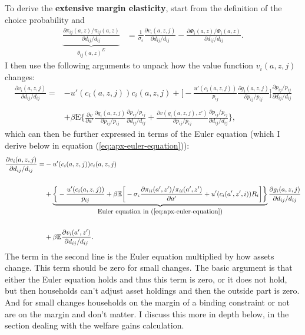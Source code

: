 \documentclass[12pt,pdftex]{article}
\begin{document}
\begin{onehalfspacing}
To derive the \textbf{extensive margin elasticity}, start from the definition of the choice probability and
\begin{align}
\underbrace{ \frac{\partial \pi_{ij}(a,z) / \pi_{ij}(a,z)}{\partial d_{ij} / d_{ij}} }_{\theta_{ij}(a,z)^{E}} &= \frac{1}{\sigma_{\epsilon}}\frac{\partial v_{i}(a, z, j)}{\partial d_{ij}/d_{ij}} -  \frac{\partial \Phi_{i}(a,z) / \Phi_{i}(a,z)}{\partial d_{ij}/d_{ij}}.
\label{eq:apx-extensive-margin}
\end{align}
I then use the following arguments to unpack how the value function $v_{i}(a, z, j)$ changes:
{\small
\begin{align}
\frac{\partial v_{i}(a,z,j)}{\partial d_{ij}/d_{ij}}  =& -u'(c_{i}(a,z,j))c_{i}(a,z,j) + \bigg [ -\frac{u'(c_{i}(a,z,j))}{p_{ij}}\frac{\partial g_{i}(a,z,j)}{\partial p_{ij}/ p_{ij}} \bigg ]\frac{\partial p_{ij}/p_{ij}}{\partial d_{ij}/ d_{ij}}  \\
\nonumber \\
&+ \beta \mathrm{E} \bigg \{\frac{\partial v}{\partial a'}\frac{\partial g_{i}(a,z,j)}{\partial p_{ij}/ p_{ij}}\frac{ \partial p_{ij}/ p_{ij}}{\partial d_{ij}/ d_{ij}} +  \frac{\partial v(g_{i}(a,z,j),z')}{\partial p_{ij}/ p_{ij}}\frac{ \partial p_{ij}/ p_{ij}}{\partial d_{ij}/ d_{ij}} \bigg \},
\end{align}}
which can then be further expressed in terms of the Euler equation (which I derive below in equation (\ref{eq:apx-euler-equation})):
{\small
\begin{align}
\frac{\partial v_{i}(a,z,j)}{\partial d_{ij}/d_{ij}}  =& -u'(c_{i}(a,z,j))c_{i}(a,z,j) \label{eq:apx-first-term}\\
\nonumber \\
&+ \underbrace{\bigg \{ -\frac{u'(c_{i}(a,z,j))}{p_{ij}} + \beta \mathbb{E} \bigg [ -\sigma_{\epsilon} \frac{\partial \pi_{ii}(a',z') / \pi_{ii}(a',z')}{\partial a'} + u'(c_{i}(a',z',i))R_{i} \bigg ] \bigg \} }_{\mbox{Euler equation in (\ref{eq:apx-euler-equation})}} \frac{\partial g_{i}(a,z,j)}{\partial d_{ij}/ d_{ij}}\\
\nonumber \\
&+  \beta \mathbb{E}\frac{\partial v_{i}(a',z')}{\partial d_{ij}/ d_{ij}}.
\end{align}}
The term in the second line is the Euler equation multiplied by how assets change. This term should be zero for small changes. The basic argument is that either the Euler equation holds and thus this term is zero, or it does not hold, but then households can't adjust asset holdings and then the outside part is zero. And for small changes households on the margin of a binding constraint or not are on the margin and don't matter. I discuss this more in depth below, in the section dealing with the welfare gains calculation.


\end{onehalfspacing}
\end{document}
